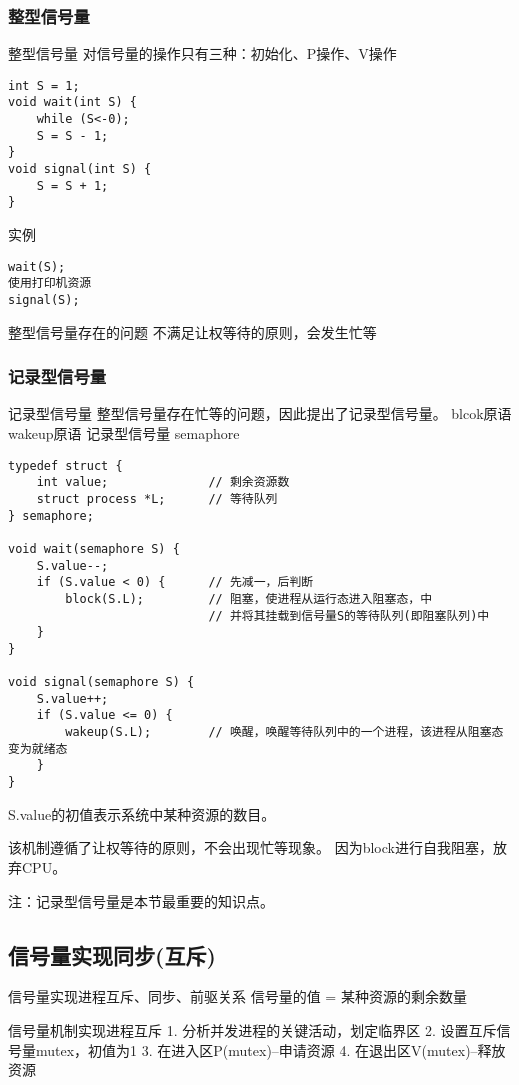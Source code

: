 \subsubsection{整型信号量}
整型信号量
对信号量的操作只有三种：初始化、P操作、V操作

\begin{lstlisting}	
int S = 1;
void wait(int S) {
	while (S<-0);
	S = S - 1;
}
void signal(int S) {
	S = S + 1;
}	
\end{lstlisting}

实例
\begin{lstlisting}
wait(S);
使用打印机资源
signal(S);
\end{lstlisting}

整型信号量存在的问题
不满足让权等待的原则，会发生忙等

\subsubsection{记录型信号量}
记录型信号量
整型信号量存在忙等的问题，因此提出了记录型信号量。
blcok原语
wakeup原语
记录型信号量 semaphore

\begin{lstlisting}
typedef struct {
	int value;				// 剩余资源数
	struct process *L;		// 等待队列
} semaphore;

void wait(semaphore S) {
	S.value--;
	if (S.value < 0) {		// 先减一，后判断
		block(S.L);			// 阻塞，使进程从运行态进入阻塞态，中
							// 并将其挂载到信号量S的等待队列(即阻塞队列)中
	}
}

void signal(semaphore S) {
	S.value++;
	if (S.value <= 0) {
		wakeup(S.L);		// 唤醒，唤醒等待队列中的一个进程，该进程从阻塞态变为就绪态
	}
}
\end{lstlisting}

S.value的初值表示系统中某种资源的数目。

该机制遵循了让权等待的原则，不会出现忙等现象。
因为block进行自我阻塞，放弃CPU。

注：记录型信号量是本节最重要的知识点。

\subsection{信号量实现同步(互斥)}
信号量实现进程互斥、同步、前驱关系
信号量的值 = 某种资源的剩余数量

信号量机制实现进程互斥
1. 分析并发进程的关键活动，划定临界区
2. 设置互斥信号量mutex，初值为1
3. 在进入区P(mutex)--申请资源
4. 在退出区V(mutex)--释放资源

